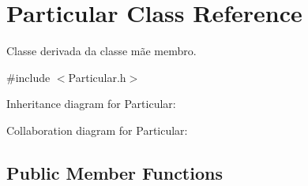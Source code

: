 \hypertarget{class_particular}{\section{Particular Class Reference}
\label{class_particular}
}


Classe derivada da classe mãe membro.  




{\ttfamily \#include $<$Particular.\+h$>$}



Inheritance diagram for Particular\+:


Collaboration diagram for Particular\+:
\subsection*{Public Member Functions}
